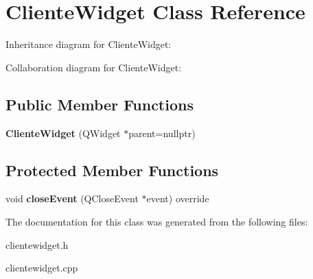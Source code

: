 \hypertarget{class_cliente_widget}{}\section{Cliente\+Widget Class Reference}
\label{class_cliente_widget}


Inheritance diagram for Cliente\+Widget\+:


Collaboration diagram for Cliente\+Widget\+:
\subsection*{Public Member Functions}
\begin{DoxyCompactItemize}
\item 
\mbox{\label{class_cliente_widget_ae3a81985dabbaa0525caa0122e11ba53}} 
{\bfseries Cliente\+Widget} (Q\+Widget $\ast$parent=nullptr)
\end{DoxyCompactItemize}
\subsection*{Protected Member Functions}
\begin{DoxyCompactItemize}
\item 
\mbox{\label{class_cliente_widget_a29a6dfbbb1f502b489c8fc9ce5ef6feb}} 
void {\bfseries close\+Event} (Q\+Close\+Event $\ast$event) override
\end{DoxyCompactItemize}


The documentation for this class was generated from the following files\+:\begin{DoxyCompactItemize}
\item 
clientewidget.\+h\item 
clientewidget.\+cpp\end{DoxyCompactItemize}
